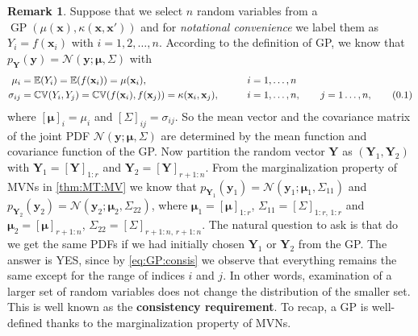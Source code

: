 \documentclass[10pt]{article}
\theoremstyle{definition}
\newtheorem*{rem}{Remark}
\newcommand\eqnum{\addtocounter{equation}{1}\tag{\arabic{section}.\arabic{equation}}}
\DeclareMathOperator{\cov}{\mathbb{CV}}
\DeclareMathOperator{\gp}{GP}
\begin{document}
\begin{rem}
Suppose that we select $n$ random variables from a $\gp(\mu(\mathbf{x}), \kappa(\mathbf{x},\mathbf{x}'))$ and for \textit{notational convenience} we label them as $Y_i=f(\mathbf{x}_i)$ with $i=1,2,\dots,n$. According to the definition of GP, we know that $p_{\mathbf{Y}}(\mathbf{y}) =\mathcal{N}(\mathbf{y};\boldsymbol{\mu}, \mathsf{\Sigma})$ with
\begin{alignat*}{2}
\mu_i &= \mathbb{E}(Y_i) =\mathbb{E}(f(\mathbf{x}_i)) = \mu(\mathbf{x}_i), && i=1,\dots, n\\
\sigma_{ij} &= \cov(Y_i, Y_j) = \cov(f(\mathbf{x}_i), f(\mathbf{x}_j)) = \kappa(\mathbf{x}_i, \mathbf{x}_j), \qquad && i=1,\dots, n, \qquad j = 1\dots,n,
\eqnum
\label{eq:GP:consis}
\end{alignat*}
where $[\boldsymbol{\mu}]_i=\mu_i$ and $[\mathsf{\Sigma}]_{ij}=\sigma_{ij}$. So the mean vector and the covariance matrix of the joint PDF $\mathcal{N}(\mathbf{y};\boldsymbol{\mu}, \mathsf{\Sigma})$ are determined by the mean function and covariance function of the GP. Now partition the random vector $\mathbf{Y}$ as $(\mathbf{Y}_1, \mathbf{Y}_2)$ with $\mathbf{Y}_1=[\mathbf{Y}]_{1:r}$ and $\mathbf{Y}_2=[\mathbf{Y}]_{r+1:n}$. From the marginalization property of MVNs in \cref{thm:MT:MV} we know that $p_{\mathbf{Y}_1}(\mathbf{y}_1) = \mathcal{N}(\mathbf{y}_1; \boldsymbol{\mu}_1, \mathsf{\Sigma}_{11})$ and $p_{\mathbf{Y}_2}(\mathbf{y}_2) = \mathcal{N}(\mathbf{y}_2; \boldsymbol{\mu}_2, \mathsf{\Sigma}_{22})$, where $\boldsymbol{\mu}_1 = [\boldsymbol{\mu}]_{1:r}$, $\mathsf{\Sigma}_{11}=[\mathsf{\Sigma}]_{1:r,\,1:r}$ and $\boldsymbol{\mu}_2 = [\boldsymbol{\mu}]_{r+1:n}$, $\mathsf{\Sigma}_{22}=[\mathsf{\Sigma}]_{r+1:n,\,r+1:n}$. The natural question to ask is that do we get the same PDFs if we had initially chosen $\mathbf{Y}_1$ or $\mathbf{Y}_2$ from the GP. The answer is YES, since by \cref{eq:GP:consis} we observe that everything remains the same except for the range of indices $i$ and $j$. In other words, examination of a larger set of random variables does not change the distribution of the smaller set. This is well known as the \textbf{consistency requirement}. To recap, a GP is well-defined thanks to the marginalization property of MVNs. 
\end{rem}
\end{document}
